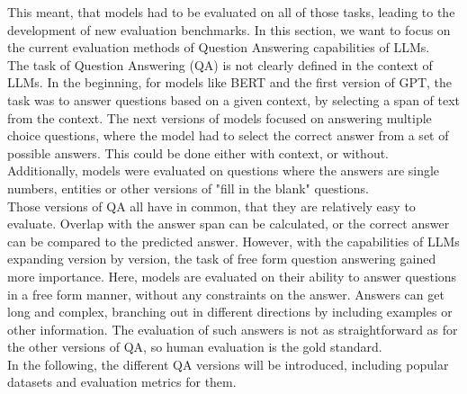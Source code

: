 This meant, that models had to be evaluated on all of those tasks, leading to the development of new evaluation benchmarks.
In this section, we want to focus on the current evaluation methods of Question Answering capabilities of LLMs.
\\
The task of Question Answering (QA) is not clearly defined in the context of LLMs.
In the beginning, for models like BERT and the first version of GPT, the task was to answer questions based on a given context, by selecting a span of text from the context.
The next versions of models focused on answering multiple choice questions, where the model had to select the correct answer from a set of possible answers.
This could be done either with context, or without.
Additionally, models were evaluated on questions where the answers are single numbers, entities or other versions of "fill in the blank" questions.
\\
Those versions of QA all have in common, that they are relatively easy to evaluate.
Overlap with the answer span can be calculated, or the correct answer can be compared to the predicted answer.
However, with the capabilities of LLMs expanding version by version, the task of free form question answering gained more importance.
Here, models are evaluated on their ability to answer questions in a free form manner, without any constraints on the answer.
Answers can get long and complex, branching out in different directions by including examples or other information.
The evaluation of such answers is not as straightforward as for the other versions of QA, so human evaluation is the gold standard.
\\
In the following, the different QA versions will be introduced, including popular datasets and evaluation metrics for them.

